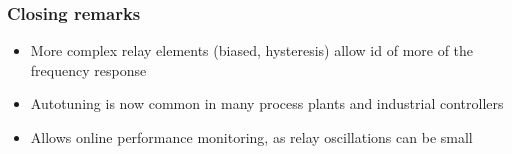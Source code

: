 \documentclass[10pt]{beamer-control}
\begin{document}
\begin{frame}
  \frametitle{Closing remarks}
  \begin{itemize}
    \item More complex relay elements (biased, hysteresis) allow id of more of the frequency response
    \item Autotuning is now common in many process plants and industrial controllers
    \item Allows online performance monitoring, as relay oscillations can be small
  \end{itemize}
\end{frame}

\SUMMARYFRAME
\FINALE
\end{document}
